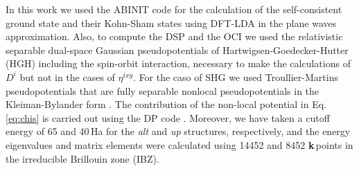 \documentclass[aps,pra,11pt,tightenlines,showpacs,superscriptaddress,groupedaddress]{revtex4-1}
\newcommand{\ea}{$\eta^{ixy}$}
\begin{document}
In this work we used the ABINIT code \cite{torrent2008implementation} for the
calculation of the self-consistent ground state and their Kohn-Sham states
using DFT-LDA in the plane waves approximation. Also, to compute the DSP
and the OCI we used the relativistic separable dual-space Gaussian
pseudopotentials of Hartwigsen-Goedecker-Hutter (HGH)
\cite{hartwigsen1998relativistic} including the spin-orbit interaction,
necessary to make the calculations of $D^{i} $ but not in the cases of {\ea}.
For the caso of SHG we used Troullier-Martins pseudopotentials
\cite{troullier1991efficient} that are fully separable nonlocal
pseudopotentials in the Kleiman-Bylander form \cite{kleinman1982efficacious}.
The contribution of the non-local potential in Eq. \ref{eq:chis} is carried out
using the DP code \cite{olevanoDP}. Moreover, we have taken a cutoff energy of
65 and 40\,Ha for the \emph{alt} and \emph{up} structures, respectively, and
the energy eigenvalues and matrix elements were calculated using 14452 and 8452
\textbf{k}\,points in the irreducible Brillouin zone (IBZ).
\end{document}
